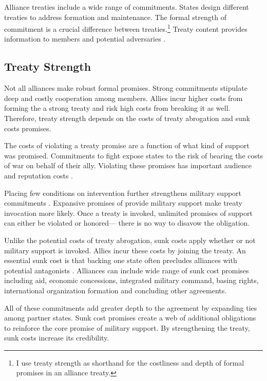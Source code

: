 \documentclass[12pt]{article}
\begin{document}
Alliance treaties include a wide range of commitments. 
States design different treaties to address formation and maintenance. 
The formal strength of commitment is a crucial difference between treaties.\footnote{I use treaty strength as shorthand for the costliness and depth of formal promises in an alliance treaty.} 
Treaty content provides information to members and potential adversaries \citep{Leeds2003}. 



\subsection{Treaty Strength}


Not all alliances make robust formal promises. 
Strong commitments stipulate deep and costly cooperation among members.
Allies incur higher costs from forming the a strong treaty and risk high costs from breaking it as well. 
Therefore, treaty strength depends on the costs of treaty abrogation and sunk costs promises. 


The costs of violating a treaty promise are a function of what kind of support was promised. 
Commitments to fight expose states to the risk of bearing the costs of war on behalf of their ally. 
Violating these promises has important audience and reputation costs \citep{Gibler2008, Crescenzietal2012, Mattes2012}. 


Placing few conditions on intervention further strengthens military support commitments \citep{Benson2012}. 
Expansive promises of provide military support make treaty invocation more likely. 
Once a treaty is invoked, unlimited promises of support can either be violated or honored--- there is no way to disavow the obligation. 


Unlike the potential costs of treaty abrogation, sunk costs apply whether or not military support is invoked. 
Allies incur these costs by joining the treaty. 
An essential sunk cost is that backing one state often precludes alliances with potential antagonists \citep{Snyder1997}. 
Alliances can include wide range of sunk cost promises including aid, economic concessions, integrated military command, basing rights, international organization formation and concluding other agreements. 


All of these commitments add greater depth to the agreement by expanding ties among partner states. 
Sunk cost promises create a web of additional obligations to reinforce the core promise of military support.  
By strengthening the treaty, sunk costs increase its credibility. 
\end{document}
